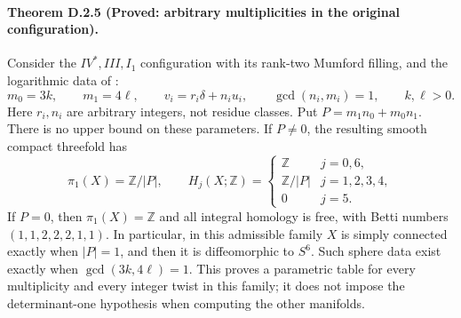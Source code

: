 \paragraph{Theorem D.2.5 (Proved: arbitrary multiplicities in the original configuration).}
Consider the $IV^*,III,I_1$ configuration with its rank-two Mumford
filling, and the logarithmic data of
\cite[\S2.1, (2.11)--(2.12)]{manViaclovskyLogs26}:
\[
 m_0=3k,\qquad m_1=4\ell,\qquad
 v_i=r_i\delta+n_i u_i,\qquad
 \gcd(n_i,m_i)=1,\qquad k,\ell>0.
\]
Here $r_i,n_i$ are arbitrary integers, not residue classes. Put
$P=m_1n_0+m_0n_1$. There is no upper bound on these parameters.
If $P\ne0$, the resulting smooth compact threefold has
\[
 \pi_1(X)=\mathbb Z/|P|,\qquad
 H_j(X;\mathbb Z)=
 \begin{cases}
 \mathbb Z&j=0,6,\\
 \mathbb Z/|P|&j=1,2,3,4,\\
 0&j=5.
 \end{cases}
\]
If $P=0$, then $\pi_1(X)=\mathbb Z$ and all integral homology
is free, with Betti numbers $(1,1,2,2,2,1,1)$.
In particular, in this admissible family $X$ is simply connected
exactly when $|P|=1$, and then it is diffeomorphic to $S^6$.
Such sphere data exist exactly when $\gcd(3k,4\ell)=1$.
This proves a parametric table for every multiplicity and every
integer twist in this family; it does not impose the determinant-one
hypothesis when computing the other manifolds.
